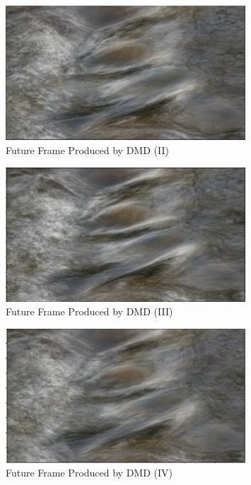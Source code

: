 \documentclass[12pt]{report}
\begin{document}
\begin{figure}[H]
    \centering
    \includegraphics[width=0.8\textwidth]{Fluid Dynamics/FD7.png}
    \caption{Future Frame Produced by DMD (II)} \label{fig:FD7}
\end{figure}
\noindent

\begin{figure}[H]
    \centering
    \includegraphics[width=0.8\textwidth]{Fluid Dynamics/FD8.png}
    \caption{Future Frame Produced by DMD (III)} \label{fig:FD8}
\end{figure}
\noindent

\begin{figure}[H]
    \centering
    \includegraphics[width=0.8\textwidth]{Fluid Dynamics/FD9.png}
    \caption{Future Frame Produced by DMD (IV)} \label{fig:FD9}
\end{figure}
\noindent
\end{document}
